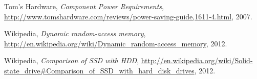 \documentclass[a4paper,final]{article}
\begin{document}
\begin{thebibliography}{9}
    Tom's Hardware,
    \emph{Component Power Requirements},
    \url{http://www.tomshardware.com/reviews/power-saving-guide,1611-4.html},
    2007.

    Wikipedia,
    \emph{Dynamic random-access memory},
    \url{http://en.wikipedia.org/wiki/Dynamic_random-access_memory},
    2012.

    Wikipedia,
    \emph{Comparison of SSD with HDD},
    \url{http://en.wikipedia.org/wiki/Solid-state_drive#Comparison_of_SSD_with_hard_disk_drives},
    2012.
\end{thebibliography}
\end{document}

